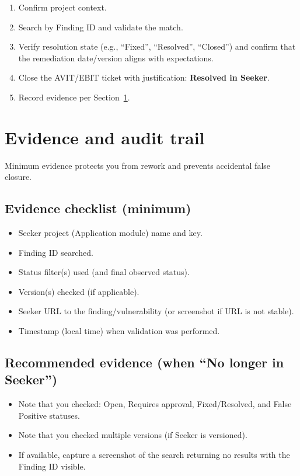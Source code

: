 \documentclass[11pt]{article}
\begin{document}
\begin{enumerate}[leftmargin=*]
  \item Confirm project context.
  \item Search by Finding ID and validate the match.
  \item Verify resolution state (e.g., ``Fixed'', ``Resolved'', ``Closed'') and confirm that the remediation date/version aligns with expectations.
  \item Close the AVIT/EBIT ticket with justification: \textbf{Resolved in Seeker}.
  \item Record evidence per Section~\ref{sec:evidence}.
\end{enumerate}

\section{Evidence and audit trail}
\label{sec:evidence}
Minimum evidence protects you from rework and prevents accidental false closure.

\subsection*{Evidence checklist (minimum)}
\begin{itemize}[leftmargin=*]
  \item Seeker project (Application module) name and key.
  \item Finding ID searched.
  \item Status filter(s) used (and final observed status).
  \item Version(s) checked (if applicable).
  \item Seeker URL to the finding/vulnerability (or screenshot if URL is not stable).
  \item Timestamp (local time) when validation was performed.
\end{itemize}

\subsection*{Recommended evidence (when ``No longer in Seeker'')}
\begin{itemize}[leftmargin=*]
  \item Note that you checked: Open, Requires approval, Fixed/Resolved, and False Positive statuses.
  \item Note that you checked multiple versions (if Seeker is versioned).
  \item If available, capture a screenshot of the search returning no results with the Finding ID visible.
\end{itemize}
\end{document}
